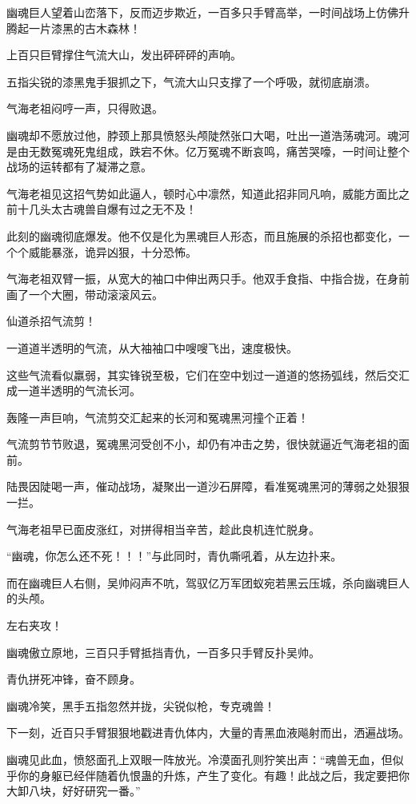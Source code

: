 \begin{this_body}
幽魂巨人望着山峦落下，反而迈步欺近，一百多只手臂高举，一时间战场上仿佛升腾起一片漆黑的古木森林！

上百只巨臂撑住气流大山，发出砰砰砰的声响。

五指尖锐的漆黑鬼手狠抓之下，气流大山只支撑了一个呼吸，就彻底崩溃。

气海老祖闷哼一声，只得败退。

幽魂却不愿放过他，脖颈上那具愤怒头颅陡然张口大喝，吐出一道浩荡魂河。魂河是由无数冤魂死鬼组成，跌宕不休。亿万冤魂不断哀鸣，痛苦哭嚎，一时间让整个战场的运转都有了凝滞之意。

气海老祖见这招气势如此逼人，顿时心中凛然，知道此招非同凡响，威能方面比之前十几头太古魂兽自爆有过之无不及！

此刻的幽魂彻底爆发。他不仅是化为黑魂巨人形态，而且施展的杀招也都变化，一个个威能暴涨，诡异凶狠，十分恐怖。

气海老祖双臂一振，从宽大的袖口中伸出两只手。他双手食指、中指合拢，在身前画了一个大圈，带动滚滚风云。

仙道杀招气流剪！

一道道半透明的气流，从大袖袖口中嗖嗖飞出，速度极快。

这些气流看似羸弱，其实锋锐至极，它们在空中划过一道道的悠扬弧线，然后交汇成一道半透明的气流长河。

轰隆一声巨响，气流剪交汇起来的长河和冤魂黑河撞个正着！

气流剪节节败退，冤魂黑河受创不小，却仍有冲击之势，很快就逼近气海老祖的面前。

陆畏因陡喝一声，催动战场，凝聚出一道沙石屏障，看准冤魂黑河的薄弱之处狠狠一拦。

气海老祖早已面皮涨红，对拼得相当辛苦，趁此良机连忙脱身。

“幽魂，你怎么还不死！！！”与此同时，青仇嘶吼着，从左边扑来。

而在幽魂巨人右侧，吴帅闷声不吭，驾驭亿万军团蚁宛若黑云压城，杀向幽魂巨人的头颅。

左右夹攻！

幽魂傲立原地，三百只手臂抵挡青仇，一百多只手臂反扑吴帅。

青仇拼死冲锋，奋不顾身。

幽魂冷笑，黑手五指忽然并拢，尖锐似枪，专克魂兽！

下一刻，近百只手臂狠狠地戳进青仇体内，大量的青黑血液飚射而出，洒遍战场。

幽魂见此血，愤怒面孔上双眼一阵放光。冷漠面孔则狞笑出声：“魂兽无血，但似乎你的身躯已经伴随着仇恨蛊的升炼，产生了变化。有趣！此战之后，我定要把你大卸八块，好好研究一番。”


\end{this_body}
